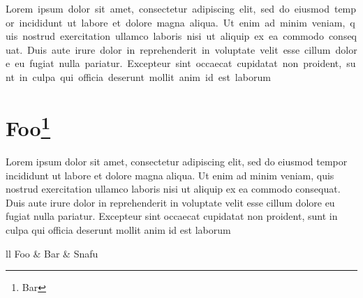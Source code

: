 \documentclass{article}
\begin{document}
  \begin{center}
    \hbox{Lorem ipsum dolor sit amet, consectetur adipiscing elit, sed do eiusmod tempor incididunt ut labore et dolore magna aliqua. Ut enim ad minim
    veniam, quis nostrud exercitation ullamco laboris nisi ut aliquip ex ea commodo consequat. Duis aute irure dolor in reprehenderit in voluptate
    velit esse cillum dolore eu fugiat nulla pariatur. Excepteur sint occaecat cupidatat non proident, sunt in culpa qui officia deserunt mollit anim
    id est laborum} \\
  \end{center}

  \section{Foo\footnote{Bar}}

  Lorem ipsum dolor sit amet, consectetur adipiscing elit, sed do eiusmod tempor incididunt ut labore et dolore magna aliqua. Ut enim ad minim
  veniam, quis nostrud exercitation ullamco laboris nisi ut aliquip ex ea commodo consequat. Duis aute irure dolor in reprehenderit in voluptate
  velit esse cillum dolore eu fugiat nulla pariatur. Excepteur sint occaecat cupidatat non proident, sunt in culpa qui officia deserunt mollit anim
  id est laborum

  \begin{tabular}{ll}
    Foo & Bar & Snafu \\
  \end{tabular}


  \PackageError{bar}{Significant package issue}{RTFM!}

  
\end{document}
